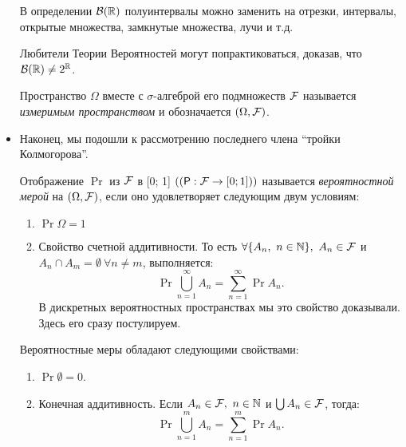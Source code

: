 \begin{itemize}
        \begin{exercise}
            В определении \(\mathcal{B}(\mathbb{R})\) полуинтервалы можно заменить на отрезки, интервалы, открытые множества, замкнутые множества, лучи и т.д.

            Любители Теории Вероятностей  могут попрактиковаться, доказав, что \(\mathcal{B}(\mathbb{R}) \neq 2^{\mathbb{R}}\).

        \end{exercise}

        \begin{definition}
            Пространство $ \Omega $ вместе с $ \sigma $-алгеброй его подмножеств $ \mathcal{F} $ называется \emph{измеримым пространством} и обозначается \((\Omega, \mathcal{F})\).
        \end{definition}

    \item Наконец, мы подошли к рассмотрению последнего члена ``тройки Колмогорова''.

        \begin{definition}
            Отображение $ \Pr $ из $ \mathcal{F} $ в [0; 1] \(\left( (\Pr: \F \to [0; 1]) \right)\) называется \emph{вероятностной мерой} на \( (\Omega, \mathcal{F}) \), если оно удовлетворяет следующим двум условиям:
                \begin{enumerate}
                    \item \(\Pr{\Omega} = 1  \)

                    \item Свойство счетной аддитивности. То есть \( \forall \{A_n,\ n \in \mathbb{N} \},\ A_n \in \mathcal{F}  \) и \(A_n \cap A_m = \emptyset\  \forall n \neq m \), выполняется: \[\Pr{\bigcup\limits_{n = 1}^{\infty}A_n} = \sum\limits_{n = 1}^{\infty}\Pr{A_n}.
                    \] В дискретных вероятностных пространствах мы это свойство доказывали. Здесь его сразу постулируем.

                \end{enumerate}
        \end{definition}

   \begin{lemma}
        Вероятностные меры обладают следующими свойствами:
        \begin{enumerate}
            \item \(\Pr{\emptyset} = 0 \).

            \item Конечная аддитивность. Если \(A_n \in \mathcal{F},\ n \in \mathbb{N}  \) и \(\bigcup A_n \in \mathcal{F} \), тогда:
            \[
                \Pr{\bigcup\limits_{n = 1}^{m}A_n} = \sum\limits_{n = 1}^{m}\Pr{A_n}.
            \]


\end{enumerate}
\end{lemma}
\end{itemize}

